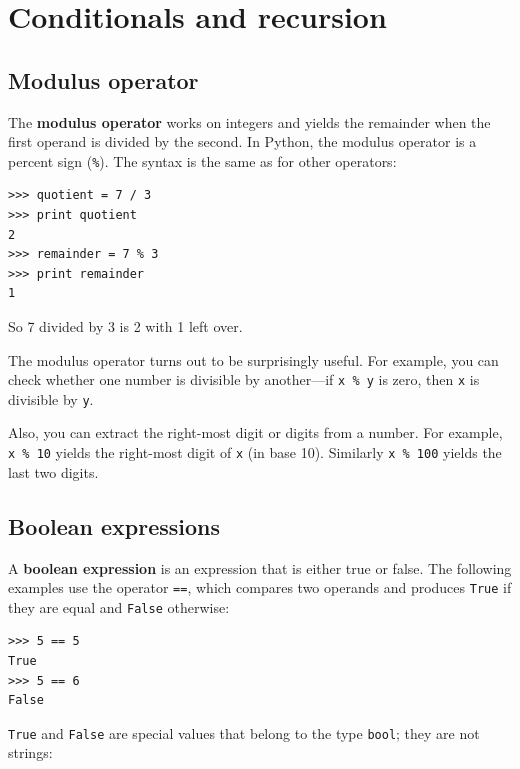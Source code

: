 \documentclass[10pt]{book}
\begin{document}
\begin{CJK}{UTF8}{gbsn}
\begin{exercise}
\end{exercise}


\chapter{Conditionals and recursion}

\section{Modulus operator}

The {\bf modulus operator} works on integers and yields the remainder
when the first operand is divided by the second.  In Python, the
modulus operator is a percent sign (\verb"%").  The syntax is the same
as for other operators:

\begin{verbatim}
>>> quotient = 7 / 3
>>> print quotient
2
>>> remainder = 7 % 3
>>> print remainder
1
\end{verbatim}
%
So 7 divided by 3 is 2 with 1 left over.

The modulus operator turns out to be surprisingly useful.  For
example, you can check whether one number is divisible by another---if
{\tt x \% y} is zero, then {\tt x} is divisible by {\tt y}.

Also, you can extract the right-most digit
or digits from a number.  For example, {\tt x \% 10} yields the
right-most digit of {\tt x} (in base 10).  Similarly {\tt x \% 100}
yields the last two digits.


\section{Boolean expressions}

A {\bf boolean expression} is an expression that is either true
or false.  The following examples use the 
operator {\tt ==}, which compares two operands and produces
{\tt True} if they are equal and {\tt False} otherwise:

\begin{verbatim}
>>> 5 == 5
True
>>> 5 == 6
False
\end{verbatim}
%
{\tt True} and {\tt False} are special
values that belong to the type {\tt bool}; they are not strings:


\end{CJK}
\end{document}
